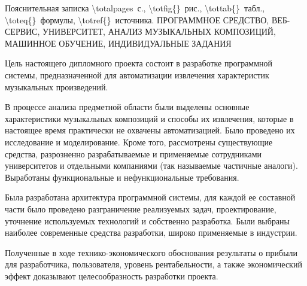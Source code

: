 \thispagestyle{empty}


\begin{center}
	Пояснительная записка \num{\totalpages}~с., \num{\totfig{}}~рис., \num{\tottab{}}~табл., \num{\toteq{}}~формулы, \num{\totref{}}~источника.
	\MakeUppercase{Программное средство, веб-сервис, университет, анализ музыкальных композиций, машинное обучение, индивидуальные задания}
\end{center}

Цель настоящего дипломного проекта состоит в разработке программной системы, предназначенной для автоматизации извлечения характеристик музыкальных произведений.

В процессе анализа предметной области были выделены основные характеристики музыкальных композиций и способы их извлечения, которые в настоящее время практически не охвачены автоматизацией. Было проведено их исследование и моделирование. Кроме того, рассмотрены существующие средства, разрозненно разрабатываемые и применяемые сотрудниками университетов и отдельными компаниями (так называемые частичные аналоги). Выработаны функциональные и нефункциональные требования.

Была разработана архитектура программной системы, для каждой ее составной части было проведено разграничение реализуемых задач, проектирование, уточнение используемых технологий и собственно разработка. Были выбраны наиболее современные средства разработки, широко применяемые в индустрии.

Полученные в ходе технико-экономического обоснования результаты о прибыли для разработчика, пользователя, уровень рентабельности, а также экономический эффект доказывают целесообразность разработки проекта.
